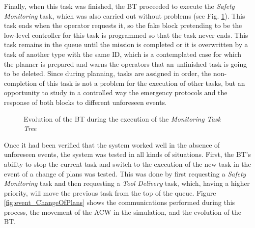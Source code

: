Finally, when this task was finished, the \gls{BT} proceeded to execute the \emph{Safety Monitoring} task, which was also carried out without problems (see Fig. \ref{fig:Gazebo_MonitorTree}). This task ends when the operator requests it, so the fake block pretending to be the low-level controller for this task is programmed so that the task never ends. This task remains in the queue until the mission is completed or it is overwritten by a task of another type with the same \gls{ID}, which is a contemplated case for which the planner is prepared and warns the operators that an unfinished task is going to be deleted. Since during planning, tasks are assigned in order, the non-completion of this task is not a problem for the execution of other tasks, but an opportunity to study in a controlled way the emergency protocols and the response of both blocks to different unforeseen events.

\begin{figure}[htbp]
    \centering
    \hfill
    \caption{Evolution of the \gls{BT} during the execution of the \emph{Monitoring Task Tree}}
    \label{fig:Gazebo_MonitorTree}
\end{figure}

Once it had been verified that the system worked well in the absence of unforeseen events, the system was tested in all kinds of situations. First, the \gls{BT}'s ability to stop the current task and switch to the execution of the new task in the event of a change of plans was tested. This was done by first requesting a \emph{Safety Monitoring} task and then requesting a \emph{Tool Delivery} task, which, having a higher priority, will move the previous task from the top of the queue. Figure \ref{fig:event_ChangeOfPlans} shows the communications performed during this process, the movement of the \gls{ACW} in the simulation, and the evolution of the \gls{BT}.

